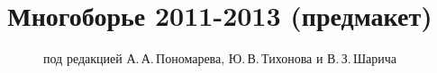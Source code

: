 \title{Многоборье 2011-2013 (предмакет)}\date{}
\author{под редакцией А.\,А.\,Пономарева, Ю.\,В.\,Тихонова и В.\,З.\,Шарича}
\maketitle

\tableofcontents

